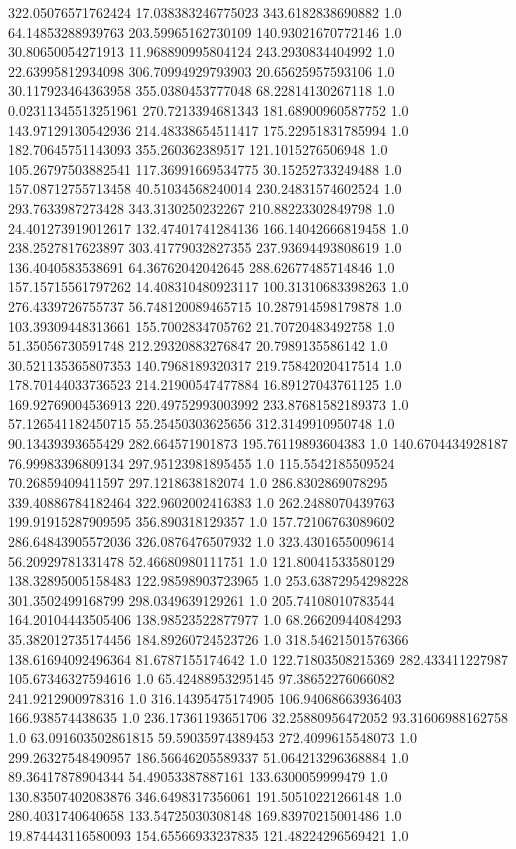 322.05076571762424	17.038383246775023	343.6182838690882	1.0
64.14853288939763	203.59965162730109	140.93021670772146	1.0
30.80650054271913	11.968890995804124	243.2930834404992	1.0
22.63995812934098	306.70994929793903	20.65625957593106	1.0
30.117923464363958	355.0380453777048	68.22814130267118	1.0
0.02311345513251961	270.7213394681343	181.68900960587752	1.0
143.97129130542936	214.48338654511417	175.22951831785994	1.0
182.70645751143093	355.260362389517	121.1015276506948	1.0
105.26797503882541	117.36991669534775	30.15252733249488	1.0
157.08712755713458	40.51034568240014	230.24831574602524	1.0
293.7633987273428	343.3130250232267	210.88223302849798	1.0
24.401273919012617	132.47401741284136	166.14042666819458	1.0
238.2527817623897	303.41779032827355	237.93694493808619	1.0
136.4040583538691	64.36762042042645	288.62677485714846	1.0
157.15715561797262	14.408310480923117	100.31310683398263	1.0
276.4339726755737	56.748120089465715	10.287914598179878	1.0
103.39309448313661	155.7002834705762	21.70720483492758	1.0
51.35056730591748	212.29320883276847	20.7989135586142	1.0
30.521135365807353	140.7968189320317	219.75842020417514	1.0
178.70144033736523	214.21900547477884	16.89127043761125	1.0
169.92769004536913	220.49752993003992	233.87681582189373	1.0
57.126541182450715	55.25450303625656	312.3149910950748	1.0
90.13439393655429	282.664571901873	195.76119893604383	1.0
140.6704434928187	76.99983396809134	297.95123981895455	1.0
115.5542185509524	70.26859409411597	297.1218638182074	1.0
286.8302869078295	339.40886784182464	322.9602002416383	1.0
262.2488070439763	199.91915287909595	356.890318129357	1.0
157.72106763089602	286.64843905572036	326.0876476507932	1.0
323.4301655009614	56.20929781331478	52.46680980111751	1.0
121.80041533580129	138.32895005158483	122.98598903723965	1.0
253.63872954298228	301.3502499168799	298.0349639129261	1.0
205.74108010783544	164.20104443505406	138.98523522877977	1.0
68.26620944084293	35.382012735174456	184.89260724523726	1.0
318.54621501576366	138.61694092496364	81.6787155174642	1.0
122.71803508215369	282.433411227987	105.67346327594616	1.0
65.42488953295145	97.38652276066082	241.9212900978316	1.0
316.14395475174905	106.94068663936403	166.938574438635	1.0
236.17361193651706	32.25880956472052	93.31606988162758	1.0
63.091603502861815	59.59035974389453	272.4099615548073	1.0
299.26327548490957	186.56646205589337	51.064213296368884	1.0
89.36417878904344	54.49053387887161	133.6300059999479	1.0
130.83507402083876	346.6498317356061	191.50510221266148	1.0
280.4031740640658	133.54725030308148	169.83970215001486	1.0
19.874443116580093	154.65566933237835	121.48224296569421	1.0
